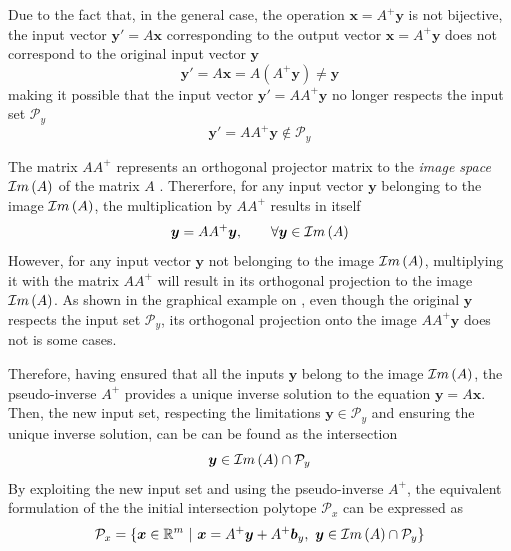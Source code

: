 Due to the fact that, in the general case, the operation $\bm{x}\!=\!A^+\bm{y}$ is not bijective, the input vector $\bm{y}'\!=\!A\bm{x}$ corresponding to the output vector $\bm{x}\!=\!A^+\bm{y}$ does not correspond to the original input vector $\bm{y}$ 
\begin{equation}
\bm{y}' = A\bm{x} = A(A^+\bm{y})\neq\bm{y}
\end{equation}
making it possible that the input vector ${\bm{y}'\!=\!AA^+\bm{y}}$ no longer respects the input set $\mathcal{P}_y$
\begin{equation}
    \bm{y}'=AA^+\bm{y}\notin\mathcal{P}_y
\end{equation}

The matrix $AA^+$ represents an orthogonal projector matrix to the \textit{image space} $\mathcal{I}m\left(A\right)$ of the matrix $A$ \cite[Chapter 5.5.4]{golub1996matrix}. Thererfore, for any input vector $\bm{y}$ belonging to the image $\mathcal{I}m\left(A\right)$, the multiplication by $AA^+$ results in itself \cite[Chapeter 1.3.1]{wang2018generalized}
\begin{equation}
    \bm{y} = AA^+\bm{y}, \qquad \forall \bm{y}\in\mathcal{I}m\left(A\right)
\end{equation}
However, for any input vector $\bm{y}$ not belonging to the image $\mathcal{I}m\left(A\right)$, multiplying it with the matrix $AA^+$ will result in its orthogonal projection to the image $\mathcal{I}m\left(A\right)$. As shown in the graphical example on , even though the original $\bm{y}$ respects the input set $\mathcal{P}_y$, its orthogonal projection onto the image $AA^+\bm{y}$ does not is some cases.

Therefore, having ensured that all the inputs $\bm{y}$ belong to the image $\mathcal{I}m\left(A\right)$, the pseudo-inverse $A^+$ provides a unique inverse solution to the equation $\bm{y} = A\bm{x}$. Then, the new input set, respecting the limitations $\bm{y}\in\mathcal{P}_y$ and ensuring the unique inverse solution, can be can be found as the intersection
\begin{equation}
   \bm{y} \in \mathcal{I}m\left(A\right) \cap \mathcal{P}_y
    \label{eq:intersection_ai}
\end{equation}
By exploiting the new input set and using the pseudo-inverse $A^+$, the equivalent formulation of the the initial intersection polytope $\mathcal{P}_x$ can be expressed as
\begin{equation}
\mathcal{P}_x=\{\bm{x}\in\mathbb{R}^m~|~ \bm{x} = A^+\bm{y} + A^+\bm{b}_y,~ \bm{y} \in \mathcal{I}m\left(A\right)\cap\mathcal{P}_y\} \label{eq:proj_inter}
\end{equation}

